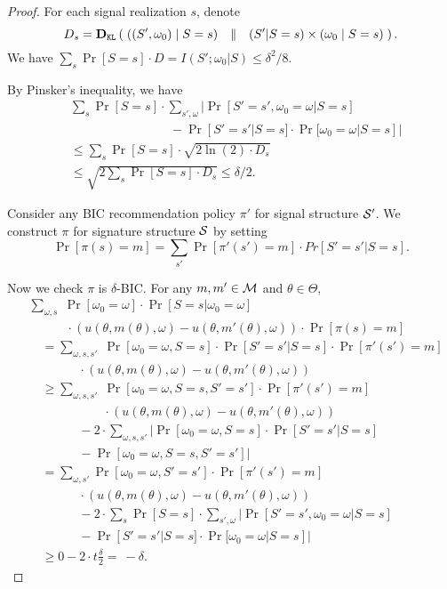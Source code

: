 \begin{proof}
For each signal realization $s$, denote
\[ D_s =  \DKL\left(\; ((S',\omega_0) \mid S=s)\quad \|\quad  (S'|S=s) \times (\omega_0\mid S=s) \;\right).  \]
We have
$\sum_{s} \Pr[S=s] \cdot D = I(S' ; \omega_0|S) \leq \delta^2/8$.

By Pinsker's inequality, we have
\begin{align*}
       &\sum_{s} \Pr[S = s]\cdot \sum_{s', \omega} | \Pr[S' = s', \omega_0 = \omega| S= s]\\
       & \qquad \qquad\qquad\qquad- \Pr[S'=s'|S=s] \cdot \Pr[\omega_0 = \omega|S=s]| \\
&\leq\textstyle  \sum_{s} \Pr[S=s] \cdot \sqrt{2 \ln(2)\cdot D_s  } \\
&\leq\textstyle   \sqrt{2 \sum_{s} \Pr[S=s] \cdot  D_s }
\leq  \delta /2.
\end{align*}

Consider any BIC recommendation policy $\pi'$ for signal structure $\S'$. We construct $\pi$ for signature structure $\S$ by setting
\[ \textstyle \Pr[\pi(s) = m] = \sum_{s'} \Pr[\pi'(s') = m] \cdot Pr[S' = s'|S = s].\]

Now we check $\pi$ is $\delta$-BIC. For any $m,m' \in \M$ and $\theta \in \varTheta$,
\begin{align*}
& \textstyle \sum_{\omega,s}\;
    \Pr[\omega_0= \omega] \cdot \Pr[S = s | \omega_0 = \omega] \\
&\quad\qquad \cdot \left(u(\theta, m(\theta), \omega) - u(\theta, m'(\theta), \omega)\right)
\cdot  \Pr[\pi(s) = m] \\
&\quad=
    \textstyle \sum_{\omega,s,s'}\;
        \Pr[\omega_0 = \omega, S = s] \cdot \Pr[ S'=s'|S= s] \cdot \Pr[\pi'(s') = m]   \\
&\qquad\qquad\cdot \left(u(\theta, m(\theta), \omega) - u(\theta, m'(\theta), \omega)\right)\\
&\quad\geq \textstyle \sum_{\omega,s,s'}\;
 \Pr[\omega_0 = \omega, S = s, S'=s'] \cdot \Pr[\pi'(s') = m]   \\
&\qquad\qquad\qquad\cdot \left(u(\theta, m(\theta), \omega) - u(\theta, m'(\theta),
 \omega)\right)\\
&\qquad\qquad -2 \cdot \sum_{\omega,s,s'} | \Pr[\omega_0 = \omega, S = s] \cdot \Pr[ S'=s'|S= s]\\
&\qquad\qquad -  \Pr[\omega_0 = \omega, S = s, S'=s']| \\
&\quad= \sum_{\omega,s'} \Pr[\omega_0 = \omega, S'=s'] \cdot \Pr[\pi'(s') = m]  \\
&\qquad\qquad \cdot \left(u(\theta, m(\theta), \omega) - u(\theta, m'(\theta),
 \omega)\right)\\
&\qquad\qquad -2 \cdot \sum_{s} \Pr[S = s] \cdot  \sum_{s', \omega} | \Pr[S' = s', \omega_0 = \omega| S= s] \\
&\qquad\qquad- \Pr[S'=s'|S=s] \cdot \Pr[\omega_0 = \omega|S=s]| \\
&\quad\geq  0- 2 \cdot t\tfrac{\delta}{2} = ~-\delta.
\end{align*}


\end{proof}
